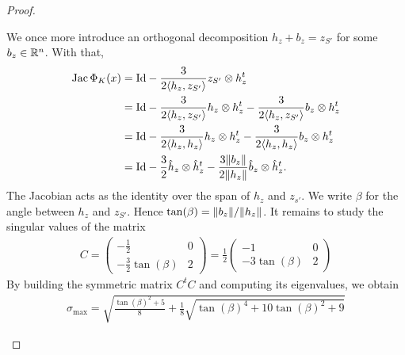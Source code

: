 \documentclass[10pt,a4paper]{article}
\begin{document}
\begin{proof}
\begin{itemize}
        We once more introduce an orthogonal decomposition $h_{z} + b_{z} = z_{S'}$ for some $b_{z} \in {\mathbb R}^{n}$.
        With that,
        \begin{align*}
            \operatorname{{\rm Jac}} \Phi_{K}(x)
            &=
            {\rm Id} 
            - 
            \frac{3}{ 2 \langle h_{z},z_{S'}\rangle }  
            z_{S'} \otimes h_{z}^{t}
            \\
            &=
            {\rm Id} 
            - 
            \frac{3}{ 2 \langle h_{z},z_{S'}\rangle } 
            h_{z} \otimes h_{z}^{t}
            - 
            \frac{3}{ 2 \langle h_{z},z_{S'}\rangle } 
            b_{z} \otimes h_{z}^{t}
            \\
            &=
            {\rm Id} 
            - 
            \frac{3}{ 2 \langle h_{z}, h_{z}\rangle } 
            h_{z} \otimes h_{z}^{t}
            - 
            \frac{3}{ 2 \langle h_{z}, h_{z}\rangle } 
            b_{z} \otimes h_{z}^{t}
            \\
            &=
            {\rm Id} 
            - 
            \frac{3}{ 2 } 
            \hat h_{z} \otimes \hat h_{z}^{t}
            - 
            \frac{ 3 \|  b_{z}  \| }{ 2 \|  h_{z}  \| } 
            \hat b_{z} \otimes \hat h_{z}^{t}
            .
        \end{align*}
        The Jacobian acts as the identity over the span of $h_{z}$ and $z_{s'}$.
		We write $\beta$ for the angle between $h_{z}$ and $z_{S'}$.
        Hence $\tan(\beta) = \|  b_{z}  \| / \|  h_{z}  \|$. It remains to study the singular values of the matrix 
        \begin{align*}
            C 
            = 
            \begin{pmatrix}
                -\frac 1 2             & 0 
                \\
                -\frac 3 2 \tan(\beta) & 2 
            \end{pmatrix}
			= 
			\frac 1 2 
            \begin{pmatrix}
                -1 & 0 
                \\
                -3\tan(\beta) & 2 
            \end{pmatrix}
        \end{align*}
        By building the symmetric matrix $C^{t} C$ and computing its eigenvalues, we obtain 
        \begin{align*}
            \sigma_{\max} 
            = 
            \sqrt{ \frac{ \tan(\beta)^{2} + 5 }{8} + \frac 1 8 \sqrt{ \tan(\beta)^{4} + 10 \tan(\beta)^{2} + 9 } }

\end{align*}
\end{itemize}
\end{proof}
\end{document}

